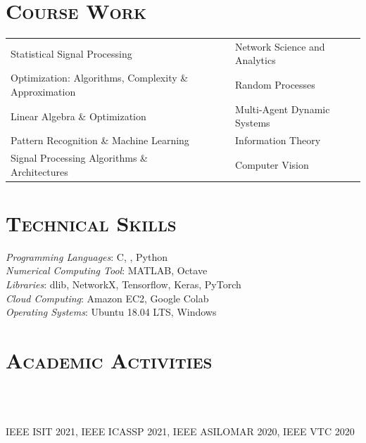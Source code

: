 \begin{resume}
\section{\textsc{Course Work}}
\begin{tabular}{llll}
Statistical Signal Processing & \ \ &  Network Science and Analytics\\
Optimization: Algorithms, Complexity \& Approximation  & \ \ & Random Processes \\
Linear Algebra \& Optimization   & \ \ & Multi-Agent Dynamic Systems \\  
Pattern Recognition \& Machine Learning   & \ \ & Information Theory \\
Signal Processing Algorithms \& Architectures   & \ \ & Computer Vision \\
\end{tabular}

\section{\textsc{Technical Skills}}

\emph{Programming Languages}: C, \Cplusplus, Python\\
\emph{Numerical Computing Tool}:  MATLAB, Octave\\
\emph{Libraries}: dlib, NetworkX, Tensorflow, Keras, PyTorch\\
\emph{Cloud Computing}: Amazon EC2, Google Colab\\
\emph{Operating Systems}: Ubuntu 18.04 LTS, Windows
     
\section{\textsc{Academic Activities}}

\begin{formatb}
  \\
  \body\\
\end{formatb}

%
\begin{position}
IEEE ISIT 2021, IEEE ICASSP 2021, IEEE ASILOMAR 2020, IEEE VTC 2020  
\end{position}


\end{resume}
